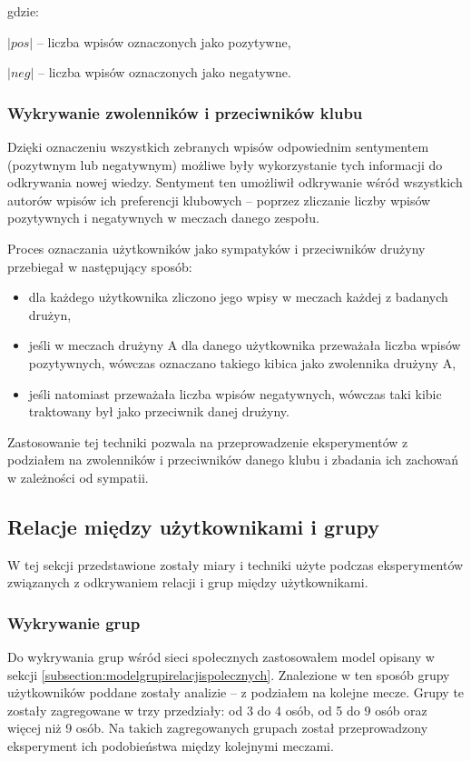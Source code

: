 gdzie:

$|pos|$ -- liczba wpisów oznaczonych jako pozytywne,

$|neg|$ -- liczba wpisów oznaczonych jako negatywne.



\subsubsection{Wykrywanie zwolenników i przeciwników klubu}
\label{subsubsection:wykrywaniezwolennikow}

Dzięki oznaczeniu wszystkich zebranych wpisów odpowiednim sentymentem
(pozytwnym lub negatywnym) możliwe były wykorzystanie tych informacji do
odkrywania nowej wiedzy. Sentyment ten umożliwił odkrywanie wśród wszystkich
autorów wpisów ich preferencji klubowych -- poprzez zliczanie liczby wpisów
pozytywnych i negatywnych w meczach danego zespołu.

Proces oznaczania użytkowników jako sympatyków i przeciwników drużyny przebiegał
w następujący sposób:
\begin{itemize}
  \item dla każdego użytkownika zliczono jego wpisy w meczach każdej z badanych 
  drużyn,
  \item jeśli w meczach drużyny A dla danego użytkownika przeważała liczba 
  wpisów pozytywnych, wówczas oznaczano takiego kibica jako zwolennika drużyny A,
  \item jeśli natomiast przeważała liczba wpisów negatywnych, wówczas taki kibic
  traktowany był jako przeciwnik danej drużyny.  
\end{itemize} 

Zastosowanie tej techniki pozwala na przeprowadzenie eksperymentów z podziałem
na zwolenników i przeciwników danego klubu i zbadania ich zachowań w zależności
od sympatii.




\subsection{Relacje między użytkownikami i grupy}
W tej sekcji przedstawione zostały miary i techniki użyte podczas eksperymentów
związanych z odkrywaniem relacji i grup między użytkownikami.

\subsubsection{Wykrywanie grup}
 \label{subsubsection:koncepcja-wykrywaniegrup}
Do wykrywania grup wśród sieci społecznych zastosowałem model opisany w sekcji
\ref{subsection:modelgrupirelacjispolecznych}. Znalezione w ten sposób grupy
użytkowników poddane zostały analizie -- z podziałem na kolejne mecze.
Grupy te zostały zagregowane w trzy przedziały: od 3 do 4 osób, od 5 do 9 osób
oraz więcej niż 9 osób. Na takich zagregowanych grupach został przeprowadzony
eksperyment ich podobieństwa między kolejnymi meczami.

